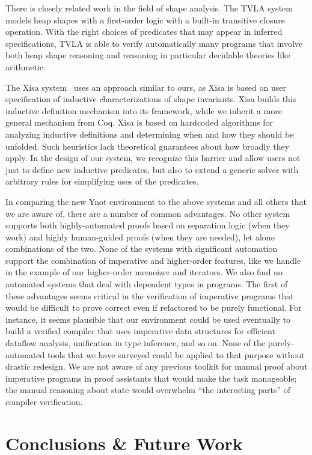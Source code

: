 \documentclass[preprint,nocopyrightspace]{sigplanconf}
\begin{document}
{There is closely related work in the field of shape analysis.  The TVLA system~\cite{tvla} models heap shapes with a first-order logic with a built-in transitive closure operation.  With the right choices of predicates that may appear in inferred specifications, TVLA is able to verify automatically many programs that involve both heap shape reasoning and reasoning in particular decidable theories like arithmetic.

The Xisa system~\cite{xisa} uses an approach similar to ours, as Xisa is based on user specification of inductive characterizations of shape invariants.  Xisa builds this inductive definition mechanism into its framework, while we inherit a more general mechanism from Coq.  Xisa is based on hardcoded algorithms for analyzing inductive definitions and determining when and how they should be unfolded.  Such heuristics lack theoretical guarantees about how broadly they apply.  In the design of our system, we recognize this barrier and allow users not just to define new inductive predicates, but also to extend a generic solver with arbitrary rules for simplifying uses of the predicates.

In comparing the new Ynot environment to the above systems and all others that we are aware of, there are a number of common advantages.  No other system supports both highly-automated proofs based on separation logic (when they work) and highly human-guided proofs (when they are needed), let alone combinations of the two.  None of the systems with significant automation support the combination of imperative and higher-order features, like we handle in the example of our higher-order memoizer and iterators.  We also find no automated systems that deal with dependent types in programs.  The first of these advantages seems critical in the verification of imperative programs that would be difficult to prove correct even if refactored to be purely functional.  For instance, it seems plausible that our environment could be used eventually to build a verified compiler that uses imperative data structures for efficient dataflow analysis, unification in type inference, and so on.  None of the purely-automated tools that we have surveyed could be applied to that purpose without drastic redesign.  We are not aware of any previous toolkit for manual proof about imperative programs in proof assistants that would make the task manageable; the manual reasoning about state would overwhelm ``the interesting parts'' of compiler verification.


\section{Conclusions \& Future Work}

}
\end{document}
